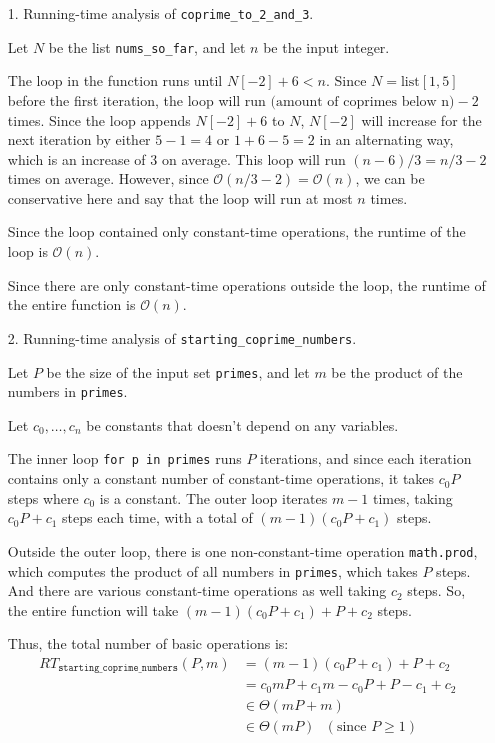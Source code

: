\documentclass[fontsize=11pt]{article}
\newcommand{\cO}{\mathcal{O}}
\newcommand{\code}[1]{\texttt{#1}}
\begin{document}
\begin{enumerate}
\item[1.]
Running-time analysis of \texttt{coprime\_to\_2\_and\_3}.

Let $N$ be the list \code{nums\_so\_far}, and let $n$ be the input integer. 

The loop in the function runs until $N[-2] + 6 < n$. Since $N = \text{list}[1, 5]$ before the first iteration, the loop will run $\text{(amount of coprimes below n)} - 2$ times. Since the loop appends $N[-2] + 6$ to $N$, $N[-2]$ will increase for the next iteration by either $5 - 1 = 4$ or $1 + 6 - 5 = 2$ in an alternating way, which is an increase of $3$ on average. This loop will run $(n - 6) / 3 = n / 3 - 2$ times on average. However, since $\cO(n / 3 - 2) = \cO(n)$, we can be conservative here and say that the loop will run at most $n$ times.

Since the loop contained only constant-time operations, the runtime of the loop is $\cO(n)$.

Since there are only constant-time operations outside the loop, the runtime of the entire function is $\cO(n)$.

\item[2.] 
Running-time analysis of \texttt{starting\_coprime\_numbers}.

Let $P$ be the size of the input set \code{primes}, and let $m$ be the product of the numbers in \code{primes}.

Let $c_0, \dots, c_n$ be constants that doesn't depend on any variables.

The inner loop \code{for p in primes} runs $P$ iterations, and since each iteration contains only a constant number of constant-time operations, it takes $c_0P$ steps where $c_0$ is a constant. The outer loop iterates $m - 1$ times, taking $c_0P + c_1$ steps each time, with a total of $(m - 1)(c_0P + c_1)$ steps.

Outside the outer loop, there is one non-constant-time operation \code{math.prod}, which computes the product of all numbers in \code{primes}, which takes $P$ steps. And there are various constant-time operations as well taking $c_2$ steps. So, the entire function will take $(m - 1)(c_0P + c_1) + P + c_2$ steps.

Thus, the total number of basic operations is:
\begin{align}
RT_{\code{starting\_coprime\_numbers}}(P, m) &= (m - 1)(c_0P + c_1) + P + c_2 \\
& = c_0mP + c_1m - c_0P + P - c_1 + c_2 \\
& \in \Theta(mP + m) \\
& \in \Theta(mP) ~~~ (\text{since } P \ge 1)
\end{align}


\end{enumerate}
\end{document}
